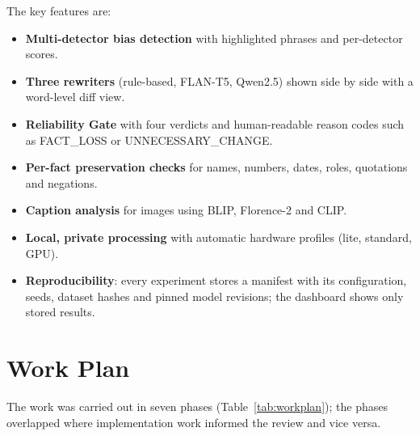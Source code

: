 \documentclass[12pt,a4paper,oneside]{report}
\begin{document}
The key features are:
\begin{itemize}
\item \textbf{Multi-detector bias detection} with highlighted phrases and per-detector scores.
\item \textbf{Three rewriters} (rule-based, FLAN-T5, Qwen2.5) shown side by side with a word-level diff view.
\item \textbf{Reliability Gate} with four verdicts and human-readable reason codes such as FACT\_LOSS or
UNNECESSARY\_CHANGE.
\item \textbf{Per-fact preservation checks} for names, numbers, dates, roles, quotations and negations.
\item \textbf{Caption analysis} for images using BLIP, Florence-2 and CLIP.
\item \textbf{Local, private processing} with automatic hardware profiles (lite, standard, GPU).
\item \textbf{Reproducibility}: every experiment stores a manifest with its configuration, seeds, dataset hashes and
pinned model revisions; the dashboard shows only stored results.
\end{itemize}

\section{Work Plan}
The work was carried out in seven phases (Table~\ref{tab:workplan}); the phases overlapped where implementation work
informed the review and vice versa.
\end{document}
